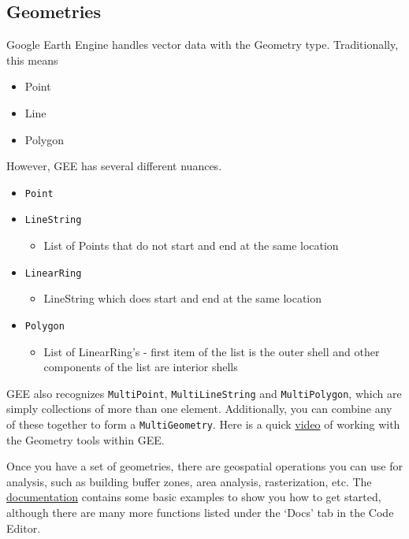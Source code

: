 \documentclass[
]{article}
\providecommand{\tightlist}{%
  \setlength{\itemsep}{0pt}\setlength{\parskip}{0pt}}
\begin{document}
\hypertarget{geometries}{%
\subsection{Geometries}\label{geometries}}

Google Earth Engine handles vector data with the Geometry type. Traditionally, this means

\begin{itemize}
\tightlist
\item
  Point
\item
  Line
\item
  Polygon
\end{itemize}

However, GEE has several different nuances.

\begin{itemize}
\tightlist
\item
  \texttt{Point}
\item
  \texttt{LineString}

  \begin{itemize}
  \tightlist
  \item
    List of Points that do not start and end at the same location
  \end{itemize}
\item
  \texttt{LinearRing}

  \begin{itemize}
  \tightlist
  \item
    LineString which does start and end at the same location
  \end{itemize}
\item
  \texttt{Polygon}

  \begin{itemize}
  \tightlist
  \item
    List of LinearRing's - first item of the list is the outer shell and other components of the list are interior shells
  \end{itemize}
\end{itemize}

GEE also recognizes \texttt{MultiPoint}, \texttt{MultiLineString} and \texttt{MultiPolygon}, which are simply collections of more than one element. Additionally, you can combine any of these together to form a \texttt{MultiGeometry}. Here is a quick \href{https://www.youtube.com/watch?v=OdBhndxgN48}{video} of working with the Geometry tools within GEE.

Once you have a set of geometries, there are geospatial operations you can use for analysis, such as building buffer zones, area analysis, rasterization, etc. The \href{https://developers.google.com/earth-engine/guides/geometric_operations}{documentation} contains some basic examples to show you how to get started, although there are many more functions listed under the `Docs' tab in the Code Editor.
\end{document}
